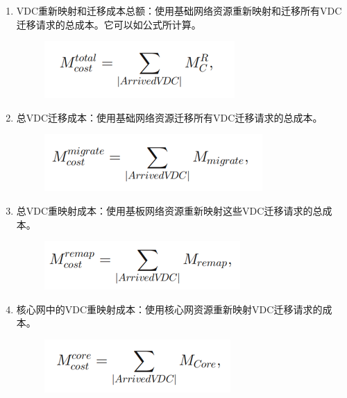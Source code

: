 \begin{enumerate}
    \item VDC重新映射和迁移成本总额：使用基础网络资源重新映射和迁移所有VDC迁移请求的总成本。它可以如公式所计算。

    \begin{figure}[!htb]
    \centering
    \includegraphics{./Figure/express15.png}
  \end{figure}

    \item 总VDC迁移成本：使用基础网络资源迁移所有VDC迁移请求的总成本。

    \begin{figure}[!htb]
    \centering
    \includegraphics{./Figure/express16.png}
  \end{figure}

    \item 总VDC重映射成本：使用基板网络资源重新映射这些VDC迁移请求的总成本。

    \begin{figure}[!htb]
    \centering
    \includegraphics{./Figure/express17.png}
  \end{figure}

    \item 核心网中的VDC重映射成本：使用核心网资源重新映射VDC迁移请求的成本。

    \begin{figure}[!htb]
    \centering
    \includegraphics{./Figure/express18.png}
  \end{figure}


\end{enumerate}
